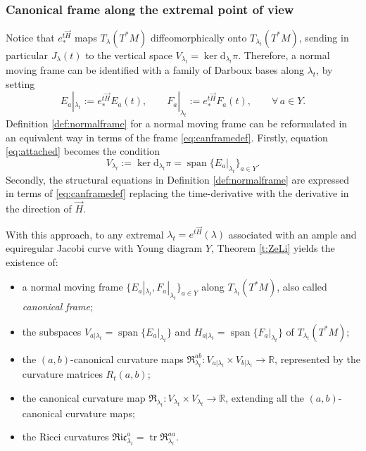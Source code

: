\documentclass[11pt,a4paper]{article}
\theoremstyle{plain}
\theoremstyle{definition}
\theoremstyle{remark}
\numberwithin{equation}{section}
\newcommand{\R}{\mathbb{R}} %
\DeclareMathOperator{\spn}{\mathrm{span}}
\DeclareMathOperator{\tr}{\mathrm{tr}}
\newcommand{\di}{\mathrm{d}}
\begin{document}
\subsubsection{Canonical frame along the extremal point of view}\label{sec:can-along-extremal}
Notice that $e^{t\vec{H}}_*$ maps $T_\lambda(T^*M)$ diffeomorphically onto $T_{\lambda_t}(T^*M)$, sending in particular $J_{\lambda}(t)$ to the vertical space $V_{\lambda_t} = \ker \di_{\lambda_t}\pi$. Therefore, a normal moving frame can be identified with a family of Darboux bases along $\lambda_t$, by setting
\begin{equation}\label{eq:canframedef}
E_a|_{\lambda_t}:= e^{t\vec{H}}_* E_a(t), \qquad F_a|_{\lambda_t}:= e^{t\vec{H}}_* F_a(t), \qquad \forall\, a \in Y.
\end{equation}
Definition \ref{def:normalframe} for a normal moving frame can be reformulated in an equivalent way in terms of the frame \eqref{eq:canframedef}. Firstly, equation \eqref{eq:attached} becomes the condition
\begin{equation}
V_{\lambda_t}:=\ker \di_{\lambda_t} \pi = \spn \{E_a|_{\lambda_t}\}_{a\in Y}.
\end{equation}
Secondly, the structural equations in Definition \ref{def:normalframe} are expressed in terms of \eqref{eq:canframedef} replacing the time-derivative with the derivative in the direction of $\vec{H}$.

With this approach, to any extremal $\lambda_t = e^{t\vec{H}}(\lambda)$ associated with an ample and equiregular Jacobi curve with Young diagram $Y$, Theorem \ref{t:ZeLi} yields the existence of:
\begin{itemize}
\item a normal moving frame $\{E_a|_{\lambda_t},F_a|_{\lambda_t}\}_{a\in Y}$ along $T_{\lambda_t}(T^*M)$, also called \emph{canonical frame};
\item the subspaces $V_{a|\lambda_t} = \spn\{E_a|_{\lambda_t}\}$ and $H_{a|\lambda_t} = \spn\{F_a|_{\lambda_t}\}$ of $T_{\lambda_t}(T^*M)$;
\item the $(a,b)$-canonical curvature maps $\mathfrak{R}_{\lambda_t}^{ab} : V_{a|\lambda_t}\times V_{b|\lambda_t}\to \R$, represented by the curvature matrices $R_t(a,b)$;
\item the canonical curvature map $\mathfrak{R}_{\lambda_t} : V_{\lambda_t} \times V_{\lambda_t} \to \R$, extending all the $(a,b)$-canonical curvature maps;
\item the Ricci curvatures $\mathfrak{Ric}_{\lambda_t}^{a}=\tr\mathfrak{R}_{\lambda_t}^{aa}$.
\end{itemize}
\end{document}
